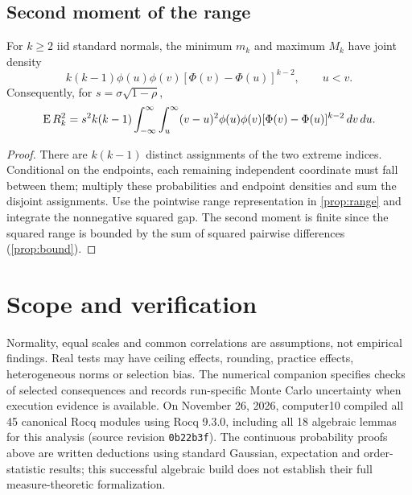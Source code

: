 \section{Second moment of the range}
\begin{proposition}\label{prop:second}
For $k\ge2$ iid standard normals, the minimum $m_k$ and maximum $M_k$
have joint density
\[
 k(k-1)\phi(u)\phi(v)[\Phi(v)-\Phi(u)]^{k-2},\qquad u<v.
\]
Consequently, for $s=\sigma\sqrt{1-\rho}$,
\[
\operatorname{E} R_k^2=s^2 k(k-1)
\int_{-\infty}^\infty\int_u^\infty
(v-u)^2\phi(u)\phi(v)[\Phi(v)-\Phi(u)]^{k-2}\,dv\,du.
\]
\end{proposition}
\begin{proof}
There are $k(k-1)$ distinct assignments of the two extreme indices.
Conditional on the endpoints, each remaining independent coordinate
must fall between them; multiply these probabilities and endpoint
densities and sum the disjoint assignments. Use the pointwise range
representation in \cref{prop:range} and integrate the nonnegative
squared gap. The second moment is finite since the squared range
is bounded by the sum of squared pairwise differences
(\cref{prop:bound}).
\end{proof}
\chapter{Scope and verification}
Normality, equal scales and common correlations are assumptions, not
empirical findings. Real tests may have ceiling effects, rounding,
practice effects, heterogeneous norms or selection bias.
The numerical companion specifies checks of selected consequences and records
run-specific Monte Carlo uncertainty when execution evidence is available.
On November 26, 2026, computer10 compiled all 45 canonical Rocq
modules using Rocq 9.3.0, including all 18 algebraic lemmas for this
analysis (source revision \texttt{0b22b3f}). The continuous probability
proofs above are written deductions using standard Gaussian,
expectation and order-statistic results; this successful algebraic build
does not establish their full measure-theoretic formalization.


\appendix
